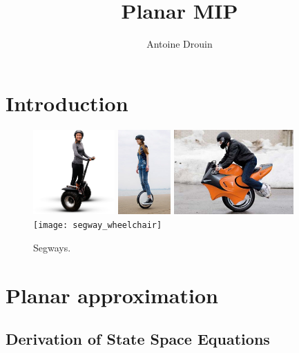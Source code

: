 \documentclass{article}
\title{Planar MIP}
\author{Antoine Drouin}
\begin{document}
\maketitle

\section{Introduction}
\begin{figure}[h]
  \centering
  \includegraphics[height=3.25cm]{images/segway}
  \includegraphics[height=3.25cm]{images/segway_one}
  \includegraphics[height=3.25cm]{images/monobike}
  \texttt{[image: segway\_wheelchair]}
  \caption{Segways.}
  \label{fig: segway}
\end{figure}

\section{Planar approximation}
\subsection{Derivation of State Space Equations}
\end{document}

